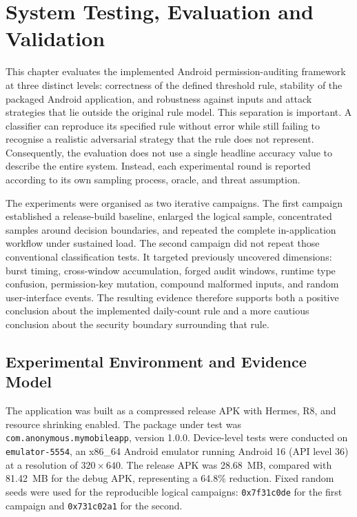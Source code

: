\newpage
\section{System Testing, Evaluation and Validation}

This chapter evaluates the implemented Android permission-auditing framework at three distinct levels: correctness of the defined threshold rule, stability of the packaged Android application, and robustness against inputs and attack strategies that lie outside the original rule model. This separation is important. A classifier can reproduce its specified rule without error while still failing to recognise a realistic adversarial strategy that the rule does not represent. Consequently, the evaluation does not use a single headline accuracy value to describe the entire system. Instead, each experimental round is reported according to its own sampling process, oracle, and threat assumption.

The experiments were organised as two iterative campaigns. The first campaign established a release-build baseline, enlarged the logical sample, concentrated samples around decision boundaries, and repeated the complete in-application workflow under sustained load. The second campaign did not repeat those conventional classification tests. It targeted previously uncovered dimensions: burst timing, cross-window accumulation, forged audit windows, runtime type confusion, permission-key mutation, compound malformed inputs, and random user-interface events. The resulting evidence therefore supports both a positive conclusion about the implemented daily-count rule and a more cautious conclusion about the security boundary surrounding that rule.

\subsection{Experimental Environment and Evidence Model}

The application was built as a compressed release APK with Hermes, R8, and resource shrinking enabled. The package under test was \texttt{com.anonymous.mymobileapp}, version 1.0.0. Device-level tests were conducted on \texttt{emulator-5554}, an x86\_64 Android emulator running Android 16 (API level 36) at a resolution of $320 \times 640$. The release APK was 28.68~MB, compared with 81.42~MB for the debug APK, representing a 64.8\% reduction. Fixed random seeds were used for the reproducible logical campaigns: \texttt{0x7f31c0de} for the first campaign and \texttt{0x731c02a1} for the second.

